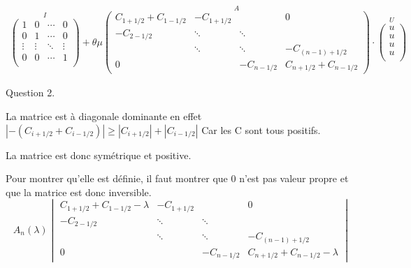 \documentclass[a4paper,11pt]{article}
\theoremstyle{nonumberplain}
\begin{document}
    \begin{calculs}
        \begin{align*}
            \overset{I} {
                \begin{pmatrix}
                    1 & 0 & \dotsb & 0 \\
                    0 & 1 & \dotsb & 0 \\
                    \vdots & \vdots & \ddots & \vdots \\
                    0 & 0 & \dotsb & 1 \\
                \end{pmatrix}
            } + \theta\mu \overset{A} {
                \begin{pmatrix}
                    C_{1 + 1/2} + C_{1 - 1/2} & -C_{1 + 1/2} & & 0\\
                    -C_{2 - 1/2} & \ddots & \ddots &  \\
                    & \ddots & \ddots &  -C_{(n - 1) + 1/2} \\
                    0 &  & -C_{n - 1/2} & C_{n + 1/2} + C_{n - 1/2}
                \end{pmatrix}
            } \cdot \overset{U} {
                \begin{pmatrix}
                    u \\
                    u \\
                    u \\
                    u \\
                \end{pmatrix}
            }
        \end{align*}
    \end{calculs}

\vspace{1cm}

Question 2.

La matrice est à diagonale dominante en effet $|-(C_{i+1/2} + C_{i-1/2})| \ge |C_{i+1/2}| + |C_{i-1/2}| $
Car les C sont tous positifs.

La matrice est donc symétrique et positive.

Pour montrer qu'elle est définie, il faut montrer que 0 n'est pas valeur propre et que la matrice est donc inversible.
$$
A_n(\lambda)
\begin{vmatrix}
  C_{1 + 1/2} + C_{1 - 1/2} - \lambda & -C_{1 + 1/2} & & 0\\
  -C_{2 - 1/2} & \ddots & \ddots &  \\
  & \ddots & \ddots &  -C_{(n - 1) + 1/2} \\
  0 &  & -C_{n - 1/2} & C_{n + 1/2} + C_{n - 1/2} - \lambda
\end{vmatrix}
  $$
\end{document}
